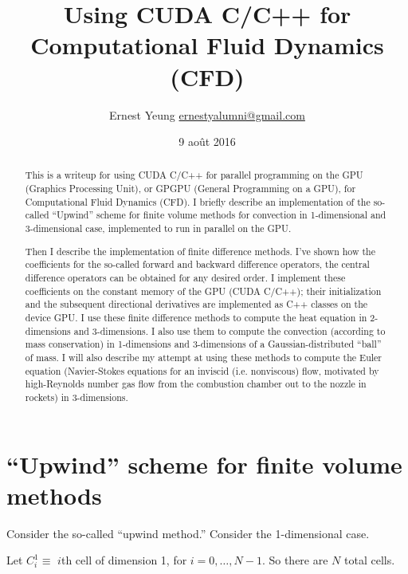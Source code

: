 \documentclass[10pt]{amsart}
\title{Using CUDA C/C++ for Computational Fluid Dynamics (CFD)}
\author{Ernest Yeung \href{mailto:ernestyalumni@gmail.com}{ernestyalumni@gmail.com}}
\date{9 ao\^{u}t 2016}
\begin{document}

\maketitle

\tableofcontents


\begin{abstract}
  This is a writeup for using CUDA C/C++ for parallel programming on the GPU (Graphics Processing Unit), or GPGPU (General Programming on a GPU), for Computational Fluid Dynamics (CFD).  I briefly describe an implementation of the so-called ``Upwind'' scheme for finite volume methods for convection in 1-dimensional and 3-dimensional case, implemented to run in parallel on the GPU.

  Then I describe the implementation of finite difference methods.  I've shown how the coefficients for the so-called forward and backward difference operators, the central difference operators can be obtained for any desired order.  I implement these coefficients on the constant memory of the GPU (CUDA C/C++); their initialization and the subsequent directional derivatives are implemented as C++ classes on the device GPU.  I use these finite difference methods to compute the heat equation in 2-dimensions and 3-dimensions.  I also use them to compute the convection (according to mass conservation) in 1-dimensions and 3-dimensions of a Gaussian-distributed ``ball'' of mass.  I will also describe my attempt at using these methods to compute the Euler equation (Navier-Stokes equations for an inviscid (i.e. nonviscous) flow, motivated by high-Reynolds number gas flow from the combustion chamber out to the nozzle in rockets) in 3-dimensions.  
\end{abstract}

\section{``Upwind'' scheme for finite volume methods}

Consider the so-called ``upwind method.''  Consider the 1-dimensional case.

Let $C_i^1 \equiv $ $i$th cell of dimension 1, for $i = 0, \dots , N-1$.  So there are $N$ total cells.
\end{document}
